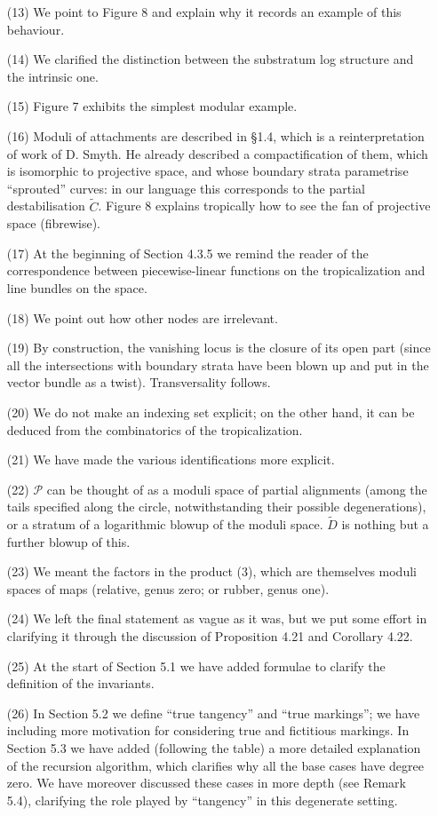 \documentclass[11pt]{amsart}
\theoremstyle{plain}
\theoremstyle{remark}
\theoremstyle{definition}
\begin{document}
\begin{enumerate}
\item[(13)] We point to Figure 8 and explain why it records an example of this behaviour.
\item[(14)] We clarified the distinction between the substratum log structure and the intrinsic one.
\item[(15)] Figure 7 exhibits the simplest modular example.
\item[(16)] Moduli of attachments are described in \S 1.4, which is a reinterpretation of work of D. Smyth. He already described a compactification of them, which is isomorphic to projective space, and whose boundary strata parametrise ``sprouted'' curves: in our language this corresponds to the partial destabilisation $\widetilde C$. Figure 8 explains tropically how to see the fan of projective space (fibrewise).
\item[(17)] At the beginning of Section 4.3.5 we remind the reader of the correspondence between piecewise-linear functions on the tropicalization and line bundles on the space.
\item[(18)] We point out how other nodes are irrelevant.
\item[(19)] By construction, the vanishing locus is the closure of its open part (since all the intersections with boundary strata have been blown up and put in the vector bundle as a twist). Transversality follows.
\item[(20)] We do not make an indexing set explicit; on the other hand, it can be deduced from the combinatorics of the tropicalization.
\item[(21)] We have made the various identifications more explicit.
\item[(22)] $\mathcal P$ can be thought of as a moduli space of partial alignments (among the tails specified along the circle, notwithstanding their possible degenerations), or a stratum of a logarithmic blowup of the moduli space. $\widetilde D$ is nothing but a further blowup of this.
\item[(23)] We meant the factors in the product (3), which are themselves moduli spaces of maps (relative, genus zero; or rubber, genus one).
\item[(24)] We left the final statement as vague as it was, but we put some effort in clarifying it through the discussion of Proposition 4.21 and Corollary 4.22.
\item[(25)] At the start of Section 5.1 we have added formulae to clarify the definition of the invariants.
\item[(26)] In Section 5.2 we define ``true tangency'' and ``true markings''; we have including more motivation for considering true and fictitious markings. In Section 5.3 we have added (following the table) a more detailed explanation of the recursion algorithm, which clarifies why all the base cases have degree zero. We have moreover discussed these cases in more depth (see Remark 5.4), clarifying the role played by ``tangency'' in this degenerate setting.

\end{enumerate}
\end{document}
